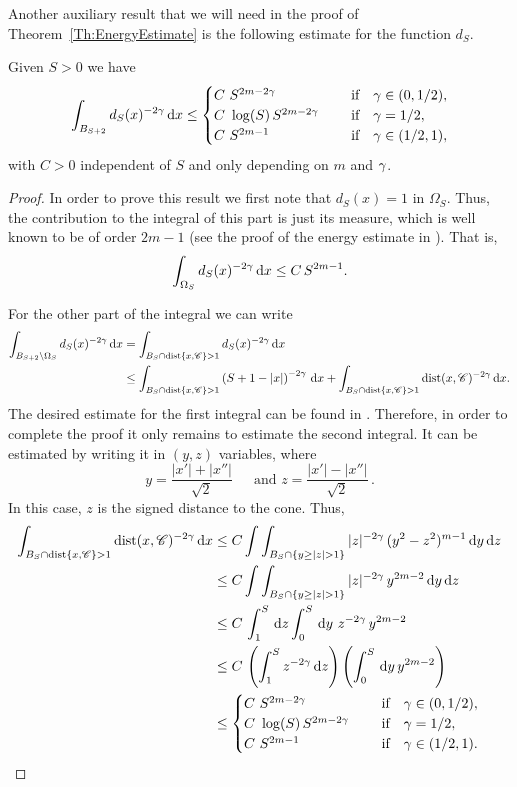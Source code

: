 Another auxiliary result that we will need in the proof of Theorem~\ref{Th:EnergyEstimate} is the following estimate for the function $d_S$. 

\begin{lemma}
\label{Lemma: Integrability_dFunction}
Given $S>0$ we have
$$ \int_{B_{S+2}} d_S(x)^{-2\gamma} \,\mathrm{d} x \leq \begin{cases}
C \ S^{2m-2\gamma}\ \ \ \ &\textrm{if } \ \ \gamma\in(0,1/2),\\
C\ \log(S)\,S^{2m-2\gamma}\ \ \ \ &\textrm{if } \ \ \gamma=1/2,\\
C \ S^{2m-1}\ \ \ \ &\textrm{if } \ \ \gamma\in(1/2,1),\\
\end{cases} $$
with $C>0$ independent of $S$ and only depending on $m$ and $\gamma$.
\end{lemma}

\begin{proof}
In order to prove this result we first note that $d_S(x)=1$ in $\Omega_S$. Thus, the contribution to the integral of this part is just its measure, which is well known to be of order $2m-1$ (see the proof of the energy estimate in \cite{CabreTerraI}). That is,
$$\int_{\Omega_S} d_S(x)^{-2\gamma} \,\mathrm{d} x \leq C\,S^{2m-1}.$$

For the other part of the integral we can write
\begin{align*}
\int_{B_{S+2}\setminus \Omega_S} d_S(x)^{-2\gamma} \,\mathrm{d} x &= \int_{B_{S}\cap \operatorname{dist}\{x,\mathscr{C}\}>1} d_S(x)^{-2\gamma} \,\mathrm{d} x \\
& \leq \int_{B_{S}\cap \operatorname{dist}\{x,\mathscr{C}\}>1} \left( S+1-|x| \right)^{-2\gamma} \,\mathrm{d} x + \int_{B_{S}\cap \operatorname{dist}\{x,\mathscr{C}\}>1} \operatorname{dist}(x,\mathscr{C})^{-2\gamma} \,\mathrm{d} x.
\end{align*}
The desired estimate for the first integral can be found in \cite{SavinValdinoci-EnergyEstimate}. Therefore, in order to complete the proof it only remains to estimate the second integral. It can be estimated by writing it in $(y,z)$ variables, where
$$
y = \dfrac{|x'|+|x''|}{\sqrt{2}} \, \quad \text{ and } z = \dfrac{|x'|-|x''|}{\sqrt{2}}\,.
$$
In this case, $z$ is the signed distance to the cone. Thus,
\begin{align*}
\int_{B_{S}\cap \dist\{x,\ccal\}>1} \dist(x,\ccal)^{-2\s} \d x &\leq C \int \int_{B_{S}\cap \{y\geq|z|>1\}} |z|^{-2\s} \, (y^2-z^2)^{m-1} \d y\d z \\
& \leq C \int \int_{B_{S}\cap \{y\geq|z|>1\}} |z|^{-2\s} \, y^{2m-2} \d y\d z \\
& \leq C\, \int_1^S \d z \int_0^S \d y\ z^{-2\s} \, y^{2m-2} \\
& \leq C\, \left(\int_1^S z^{-2\s} \d z \right)  \left(  \int_0^S \d y \, y^{2m-2} \right) \\
& \leq \begin{cases}
C \ S^{2m-2\s}\ \ \ \ &\textrm{if } \ \ \s\in(0,1/2),\\
C\ \log(S)\,S^{2m-2\s}\ \ \ \ &\textrm{if } \ \ \s=1/2,\\
C \ S^{2m-1}\ \ \ \ &\textrm{if } \ \ \s\in(1/2,1).\\
\end{cases}
\end{align*}
\end{proof}


